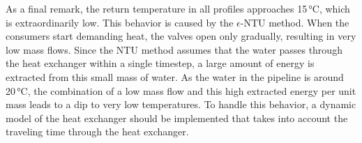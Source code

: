 As a final remark, the return temperature in all profiles approaches 15\,°C, which is extraordinarily low. This behavior is caused by the $\epsilon$-NTU method. When the consumers start demanding heat, the valves open only gradually, resulting in very low mass flows. Since the NTU method assumes that the water passes through the heat exchanger within a single timestep, a large amount of energy is extracted from this small mass of water. As the water in the pipeline is around 20\,°C, the combination of a low mass flow and this high extracted energy per unit mass leads to a dip to very low temperatures. To handle this behavior, a dynamic model of the heat exchanger should be implemented that takes into account the traveling time through the heat exchanger. 